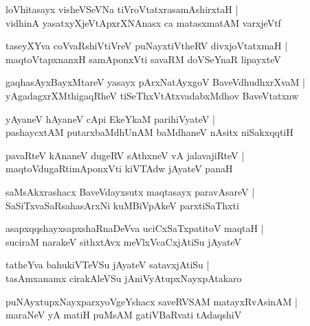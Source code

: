 \documentclass[twoside,12pt,openright]{book}
\newcounter{shloka}[chapter]
\begin{document}
\begin{shloka}%
loVhitasayx visheVSeVNa tiVroVtatxrasamAshirxtaH |\\
vidhinA yasatxyXjeVtApxrXNAnasx ca matasxmatAM varxjeVtf
\end{shloka}

\begin{shloka}%
taseyXYva coVvaRshiVtiVreV puNayxtiVtheRV divxjoVtatxmaH |\\
maqtoVtapxnanxH samAponxVti savaRM doVSeYnaR lipayxteV
\end{shloka}

\begin{shloka}%
gaqhasAyxBayxMtareV yasayx pArxNatAyxgoV BaveVdhudhxrXvaM |\\
yAgadagxrXMthigaqRheV tiSeThxVtAtxvadabxMdhov BaveVtatxnw
\end{shloka}

\begin{shloka}%
yAyaneV hAyaneV cApi EkeYkaM parihiVyateV |\\
pashaycxtAM putarxbaMdhUnAM baMdhaneV nAsitx niSakxqqtiH 
\end{shloka}

\begin{shloka}%
pavaRteV kAnaneV dugeRV sAthxneV vA jalavajiRteV |\\
maqtoVdugaRtimAponxVti kiVTAdw jAyateV panaH 
\end{shloka}

\begin{shloka}%
saMsAkxrashacx BaveVdayxsutx maqtasayx paravAsareV |\\
SaSiTxvaSaRsahasArxNi kuMBiVpAkeV parxtiSaThxti
\end{shloka}

\begin{shloka}%
asapxqqshayxsapxshaRnaDeVva uciCxSaTxpatitoV maqtaH |\\
suciraM narakeV sithxtAvx meVlxVcaCxjAtiSu jAyateV 
\end{shloka}

\begin{shloka}%
tatheYva bahukiVTeVSu jAyateV satavxjAtiSu |\\
tasAmxanamx cirakAleVSu jAniVyAtupxNayxpAtakaro
\end{shloka}

\begin{shloka}%
puNAyxtupxNayxparxyoVgeYshacx saveRVSAM matayxRvAsinAM |\\
maraNeV yA matiH puMsAM gatiVBaRvati tAdaqshiV 
\end{shloka}
\end{document}
